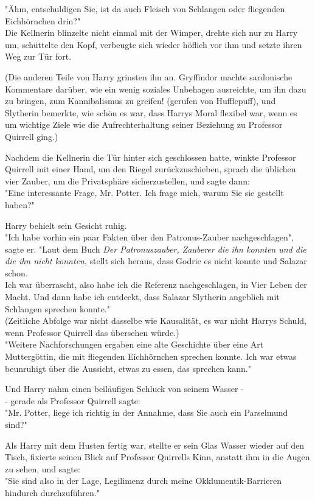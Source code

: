 {"Ähm, entschuldigen Sie, ist da auch Fleisch von Schlangen oder fliegenden Eichhörnchen drin?"\\ Die Kellnerin blinzelte nicht einmal mit der Wimper, drehte sich nur zu Harry um, schüttelte den Kopf, verbeugte sich wieder höflich vor ihm und setzte ihren Weg zur Tür fort.

(Die anderen Teile von Harry grinsten ihn an. Gryffindor machte sardonische Kommentare darüber, wie ein wenig soziales Unbehagen ausreichte, um ihn dazu zu bringen, zum Kannibalismus zu greifen! (gerufen von Hufflepuff), und Slytherin bemerkte, wie schön es war, dass Harrys Moral flexibel war, wenn es um wichtige Ziele wie die Aufrechterhaltung seiner Beziehung zu Professor Quirrell ging.)

Nachdem die Kellnerin die Tür hinter sich geschlossen hatte, winkte Professor Quirrell mit einer Hand, um den Riegel zurückzuschieben, sprach die üblichen vier Zauber, um die Privatsphäre sicherzustellen, und sagte dann:\\ "Eine interessante Frage, Mr. Potter. Ich frage mich, warum Sie sie gestellt haben?"

Harry behielt sein Gesicht ruhig.\\ "Ich habe vorhin ein paar Fakten über den Patronus-Zauber nachgeschlagen", sagte er. "Laut dem Buch \emph{Der Patronuszauber, Zauberer die ihn konnten und die die ihn nicht konnten}, stellt sich heraus, dass Godric es nicht konnte und Salazar schon.\\ Ich war überrascht, also habe ich die Referenz nachgeschlagen, in Vier Leben der Macht. Und dann habe ich entdeckt, dass Salazar Slytherin angeblich mit Schlangen sprechen konnte."\\ (Zeitliche Abfolge war nicht dasselbe wie Kausalität, es war nicht Harrys Schuld, wenn Professor Quirrell das übersehen würde.)\\ "Weitere Nachforschungen ergaben eine alte Geschichte über eine Art Muttergöttin, die mit fliegenden Eichhörnchen sprechen konnte. Ich war etwas beunruhigt über die Aussicht, etwas zu essen, das sprechen kann."

Und Harry nahm einen beiläufigen Schluck von seinem Wasser -\\ - gerade als Professor Quirrell sagte:\\ "Mr. Potter, liege ich richtig in der Annahme, dass Sie auch ein Parselmund sind?"

Als Harry mit dem Husten fertig war, stellte er sein Glas Wasser wieder auf den Tisch, fixierte seinen Blick auf Professor Quirrells Kinn, anstatt ihm in die Augen zu sehen, und sagte:\\ "Sie sind also in der Lage, Legilimenz durch meine Okklumentik-Barrieren hindurch durchzuführen."

}
